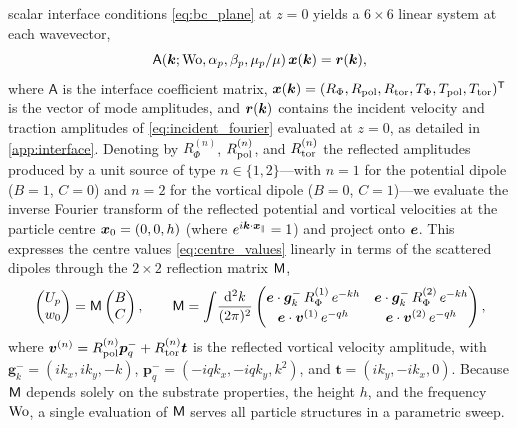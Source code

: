 scalar interface conditions \cref{eq:bc_plane} at $z=0$ yields a $6\times6$ linear system at each wavevector,
\begin{equation}
  \mathsf A(\bm{k};\mathrm{Wo},\alpha_p,\beta_p,\mu_p/\mu)\,\bm x(\bm{k})=\bm r(\bm{k}),
  \label{eq:interface_system}
\end{equation}
where $\mathsf A$ is the interface coefficient matrix,
$\bm x(\bm{k})=(R_\Phi,R_{\rm pol},R_{\rm tor},T_\Phi,T_{\rm pol},T_{\rm tor})^{\mathsf T}$ is the vector of mode amplitudes,
and $\bm r(\bm{k})$ contains the incident velocity and traction amplitudes of \cref{eq:incident_fourier} evaluated at $z=0$,
as detailed in \cref{app:interface}. Denoting by $R^{(n)}_\Phi$, $R^{(n)}_{\rm pol}$, and $R^{(n)}_{\rm tor}$ the reflected
amplitudes produced by a unit source of type $n\in\{1,2\}$---with $n=1$ for the potential dipole ($B=1$, $C=0$) and $n=2$
for the vortical dipole ($B=0$, $C=1$)---we evaluate the inverse Fourier transform of the reflected potential and
vortical velocities at the particle centre $\bm{x}_0=(0,0,h)$ (where $e^{i\bm{k}\cdot\bm{x}_\parallel}=1$) and project onto $\bm{e}$.
This expresses the centre values \cref{eq:centre_values} linearly in terms of the scattered dipoles through the
$2\times2$ reflection matrix $\mathsf{M}$,
\begin{equation}
  \begin{pmatrix}U_p\\ w_0\end{pmatrix}=\mathsf{M}\begin{pmatrix}B\\ C\end{pmatrix},\qquad
  \mathsf{M}=\int\!\frac{\mathrm{d}^2k}{(2\pi)^2}
  \begin{pmatrix}
    \bm{e}\cdot\bm g_k^-\,R^{(1)}_\Phi\,e^{-kh} & \bm{e}\cdot\bm g_k^-\,R^{(2)}_\Phi\,e^{-kh}\\[2pt]
    \bm{e}\cdot\bm v^{(1)}\,e^{-qh} & \bm{e}\cdot\bm v^{(2)}\,e^{-qh}
  \end{pmatrix},
  \label{eq:reflection_matrix}
\end{equation}
where $\bm v^{(n)}=R^{(n)}_{\rm pol}\bm p_q^-+R^{(n)}_{\rm tor}\bm t$ is the reflected vortical velocity amplitude, with
$\bm g_k^-=(ik_x,ik_y,-k)$, $\bm p_q^-=(-iqk_x,-iqk_y,k^2)$, and $\bm t=(ik_y,-ik_x,0)$. Because $\mathsf{M}$ depends solely on
the substrate properties, the height $h$, and the frequency $\mathrm{Wo}$, a single evaluation of $\mathsf{M}$ serves all particle
structures in a parametric sweep.

